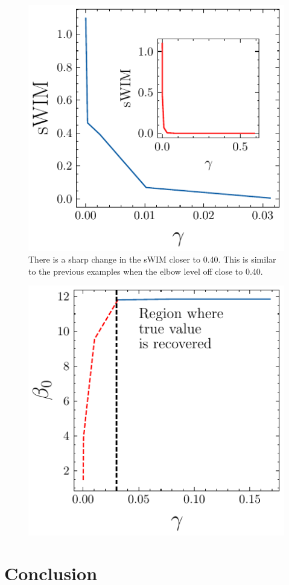 \documentclass[12pt]{article}
\begin{document}
\begin{figure}[h]
\begin{center}
\includegraphics{imgs/swimgamma.pdf}
\caption{There is a sharp change in the sWIM closer to 0.40. This is similar to the previous examples when the elbow level off close to 0.40. }
\end{center}
\end{figure}

\begin{figure}[h]
\begin{center}
\includegraphics{imgs/betagamma.pdf}
\end{center}
\end{figure}

\section{Conclusion}
\clearpage


\end{document}
